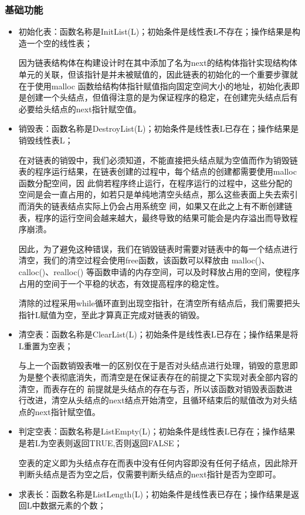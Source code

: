 \documentclass[supercite]{Experimental_Report}
\theoremstyle{definition}
\begin{document}
\subsubsection{基础功能}
\begin{itemize}
	\item 初始化表：函数名称是InitList(L)；初始条件是线性表L不存在；操作结果是构造一个空的线性表；

	      因为链表结构体在构建设计时在其中添加了名为next的结构体指针实现结构体单元的关联，但该指针是并未被赋值的，因此链表的初始化的一个重要步骤就在于使用malloc
	      函数给结构体指针赋值指向固定空间大小的地址，初始化表即是创建一个头结点，但值得注意的是为保证程序的稳定，在创建完头结点后有必要给头结点的next指针赋空值。
	\item 销毁表：函数名称是DestroyList(L)；初始条件是线性表L已存在；操作结果是销毁线性表L；

	      在对链表的销毁中，我们必须知道，不能直接把头结点赋为空值而作为销毁链表的程序运行结果，在链表创建的过程中，每个结点的创建都需要使用malloc函数分配空间，因
	      此倘若程序终止运行，在程序运行的过程中，这些分配的空间是会一直占用的，如若只是单纯地清空头结点，那么这些表面上失去索引而消失的链表结点实际上仍会占用系统空
	      间，如果又在此之上有不断创建链表，程序的运行空间会越来越大，最终导致的结果可能会是内存溢出而导致程序崩溃。

	      因此，为了避免这种错误，我们在销毁链表时需要对链表中的每一个结点进行清空，我们的清空过程会使用free函数，该函数可以释放由 malloc()、calloc()、realloc()
	      等函数申请的内存空间，可以及时释放占用的空间，使程序占用的空间于一个平稳的状态，有效提高程序的稳定性。

	      清除的过程采用while循环直到出现空指针，在清空所有结点后，我们需要把头指针L赋值为空，至此才算真正完成对链表的销毁。
	\item 清空表：函数名称是ClearList(L)；初始条件是线性表L已存在；操作结果是将L重置为空表；

	      与上一个函数销毁表唯一的区别仅在于是否对头结点进行处理，销毁的意思即为是整个表彻底消失，而清空是在保证表存在的前提之下实现对表全部内容的清空，而表存在的
	      前提就是头结点的存在与否，所以该函数对销毁表函数进行改进，清空从头结点的next结点开始清空，且循环结束后的赋值改为对头结点的next指针赋空值。
	\item 判定空表：函数名称是ListEmpty(L)；初始条件是线性表L已存在；操作结果是若L为空表则返回TRUE,否则返回FALSE；

	      空表的定义即为头结点存在而表中没有任何内容即没有任何子结点，因此除开判断头结点是否为空之后，仅需要判断头结点的next指针是否为空即可。
	\item 求表长：函数名称是ListLength(L)；初始条件是线性表已存在；操作结果是返回L中数据元素的个数；


\end{itemize}
\end{document}

